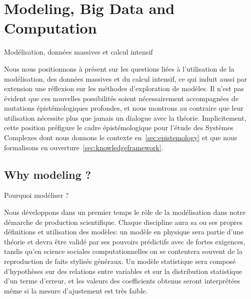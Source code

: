 





\newpage



\section{Modeling, Big Data and Computation}{Modélisation, données massives et calcul intensif}


\label{sec:computation}





Nous nous positionnons à présent sur les questions liées à l'utilisation de la modélisation, des données massives et du calcul intensif, ce qui induit aussi par extension une réflexion sur les méthodes d'exploration de modèles. Il n'est pas évident que ces nouvelles possibilités soient nécessairement accompagnées de mutations épistémologiques profondes, et nous montrons au contraire que leur utilisation nécessite plus que jamais un dialogue avec la théorie. Implicitement, cette position préfigure le cadre épistémologique pour l'étude des Systèmes Complexes dont nous donnons le contexte en~\ref{sec:epistemology} et que nous formalisons en ouverture~\ref{sec:knowledgeframework}.







\subsection{Why modeling ?}{Pourquoi modéliser ?}


Nous développons dans un premier temps le rôle de la modélisation dans notre démarche de production scientifique. Chaque discipline aura sa ou ses propres définitions et utilisation des modèles: un modèle en physique sera partie d'une théorie et devra être validé par ses pouvoirs prédictifs avec de fortes exigences, tandis qu'en science sociales computationnelles on se contentera souvent de la reproduction de faits stylisés généraux. Un modèle statistique sera composé d'hypothèses sur des relations entre variables et sur la distribution statistique d'un terme d'erreur, et les valeurs des coefficients obtenus seront interprétées même si la mesure d'ajustement est très faible. 


